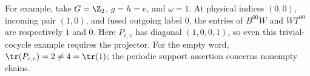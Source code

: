 For example, take $G=\Z_2$, $g=h=e$, and $\omega=1$. At physical
indices $(0,0)$, incoming pair $(1,0)$, and fused outgoing label $0$,
the entries of $B^{00}W$ and $WT^{00}$ are respectively $1$ and $0$.
Here $P_{e,e}$ has diagonal $(1,0,0,1)$, so even this trivial-cocycle
example requires the projector. For the empty word,
$\tr(P_{e,e})=2\ne4=\tr(1)$; the periodic support assertion concerns
nonempty chains.
